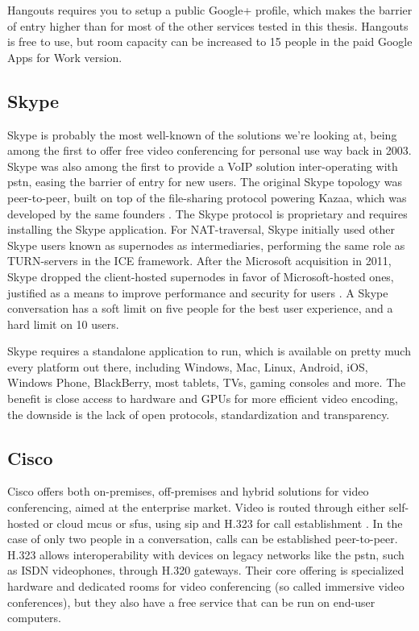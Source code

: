 Hangouts requires you to setup a public Google+ profile, which makes the barrier of entry higher than for most of the other services tested in this thesis. Hangouts is free to use, but room capacity can be increased to 15 people in the paid Google Apps for Work version.


\subsection{Skype}

Skype is probably the most well-known of the solutions we're looking at, being among the first to offer free video conferencing for personal use way back in 2003. Skype was also among the first to provide a VoIP solution inter-operating with \gls{pstn}, easing the barrier of entry for new users. The original Skype topology was peer-to-peer, built on top of the file-sharing protocol powering Kazaa, which was developed by the same founders \cite{skype-history}.  The Skype protocol is proprietary and requires installing the Skype application. For NAT-traversal, Skype initially used other Skype users known as supernodes as intermediaries, performing the same role as TURN-servers in the ICE framework. After the Microsoft acquisition in 2011, Skype dropped the client-hosted supernodes in favor of Microsoft-hosted ones, justified as a means to improve performance and security for users \cite{skype-topo-change}. A Skype conversation has a soft limit on five people for the best user experience, and a hard limit on 10 users.

Skype requires a standalone application to run, which is available on pretty much every platform out there, including Windows, Mac, Linux, Android, iOS, Windows Phone, BlackBerry, most tablets, TVs, gaming consoles and more. The benefit is close access to hardware and GPUs for more efficient video encoding, the downside is the lack of open protocols, standardization and transparency.


\subsection{Cisco}

Cisco offers both on-premises, off-premises and hybrid solutions for video conferencing, aimed at the enterprise market. Video is routed through either self-hosted or cloud \glspl{mcu} or \glspl{sfu}, using \gls{sip} and H.323 for call establishment \cite{cisco-arch}. In the case of only two people in a conversation, calls can be established peer-to-peer. H.323 allows interoperability with devices on legacy networks like the \gls{pstn}, such as ISDN videophones, through H.320 gateways. Their core offering is specialized hardware and dedicated rooms for video conferencing (so called immersive video conferences), but they also have a free service that can be run on end-user computers.
